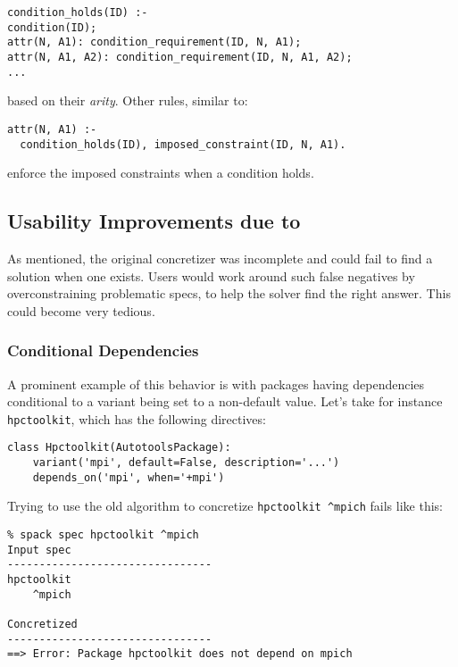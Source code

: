 \begin{verbatim}
condition_holds(ID) :-
condition(ID);
attr(N, A1): condition_requirement(ID, N, A1);
attr(N, A1, A2): condition_requirement(ID, N, A1, A2);
...
\end{verbatim}

based on their \emph{arity}. Other rules, similar to:

\begin{verbatim}
attr(N, A1) :-
  condition_holds(ID), imposed_constraint(ID, N, A1).
\end{verbatim}

enforce the imposed constraints when a condition holds.

\subsection{Usability Improvements due to \clingo}
As mentioned, the original concretizer was incomplete and could fail to find a solution
when one exists. Users would work around such false negatives by overconstraining
problematic specs, to help the solver find the right answer. This could become very
tedious.


\subsubsection{Conditional Dependencies}
A prominent example of this behavior is with packages having dependencies conditional to a variant being set to a non-default value. Let's take for instance \texttt{hpctoolkit}, which has the following directives:

\begin{verbatim}
class Hpctoolkit(AutotoolsPackage):
    variant('mpi', default=False, description='...')
    depends_on('mpi', when='+mpi')
\end{verbatim}

Trying to use the old algorithm to concretize \texttt{hpctoolkit \^{}mpich} fails like this:

\begin{verbatim}
% spack spec hpctoolkit ^mpich
Input spec
--------------------------------
hpctoolkit
    ^mpich

Concretized
--------------------------------
==> Error: Package hpctoolkit does not depend on mpich
\end{verbatim}

